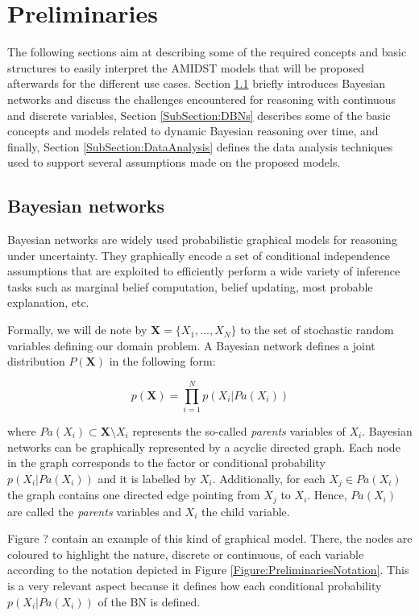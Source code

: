\section{Preliminaries}\label{Section:Preliminaries}

The following sections aim at describing some of the required concepts and basic structures to easily interpret the AMIDST models that will be proposed afterwards for the different use cases. Section \ref{SubSection:HybridBNs} briefly introduces Bayesian networks and discuss the challenges encountered for reasoning with continuous and discrete variables, Section \ref{SubSection:DBNs} describes some of the basic concepts and models related to dynamic Bayesian reasoning over time, and finally, Section \ref{SubSection:DataAnalysis} defines the data analysis techniques used to support several assumptions made on the proposed models.

\subsection{Bayesian networks}\label{SubSection:HybridBNs}

Bayesian networks \cite{JensenNielsen2007} are widely used probabilistic graphical models for reasoning under uncertainty. They graphically encode a set of conditional independence assumptions that are exploited to efficiently perform a wide variety of inference tasks such as marginal belief computation, belief updating, most probable explanation, etc.  

Formally, we will de note by $\bm X = \{X_1,\ldots,X_N\}$ to the set of stochastic random variables defining our domain problem. A Bayesian network defines a joint distribution $P(\bm X)$ in the following form:

$$ p(\bm X) = \prod_{i=1}^N p(X_i|Pa(X_i))$$ 

\noindent where $Pa(X_i)\subset \bm X\setminus X_i$ represents the so-called \emph{parents} variables of $X_i$. Bayesian networks can be graphically represented by a acyclic directed graph. Each node in the graph corresponds to the factor or conditional probability $p(X_i|Pa(X_i))$  and it is labelled by $X_i$. Additionally, for each $X_j\in Pa(X_i)$ the graph contains one directed edge pointing from $X_j$ to $X_i$. Hence, $Pa(X_i)$ are called the \emph{parents} variables and $X_i$ the child variable. 

Figure ? contain an example of this kind of graphical model. There, the nodes are coloured to highlight the nature, discrete or continuous, of each variable according to the notation depicted in Figure \ref{Figure:PreliminariesNotation}. This is a very relevant aspect because it defines how each conditional probability $p(X_i|Pa(X_i))$ of the BN is defined. 

